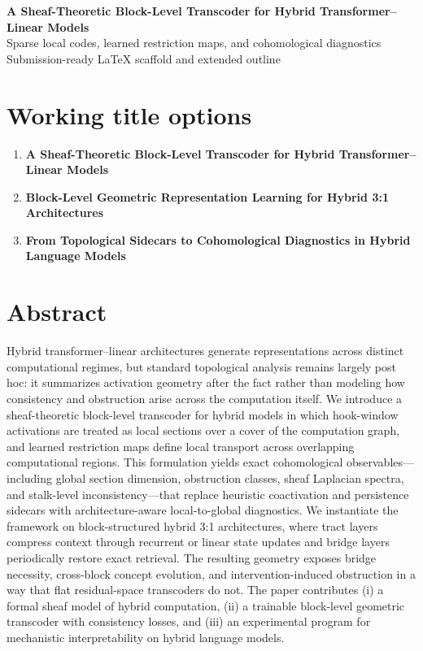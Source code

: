 \documentclass[11pt]{article}
\begin{document}
\begin{center}
{\LARGE \textbf{A Sheaf-Theoretic Block-Level Transcoder for Hybrid Transformer--Linear Models}}\\[0.5em]
{\large Sparse local codes, learned restriction maps, and cohomological diagnostics}\\[1em]
{\normalsize Submission-ready LaTeX scaffold and extended outline}
\end{center}

\vspace{1em}

\section*{Working title options}

\begin{enumerate}[leftmargin=1.5em]
    \item \textbf{A Sheaf-Theoretic Block-Level Transcoder for Hybrid Transformer--Linear Models}
    \item \textbf{Block-Level Geometric Representation Learning for Hybrid 3:1 Architectures}
    \item \textbf{From Topological Sidecars to Cohomological Diagnostics in Hybrid Language Models}
\end{enumerate}

\section*{Abstract}

Hybrid transformer--linear architectures generate representations across distinct computational regimes, but standard topological analysis remains largely post hoc: it summarizes activation geometry after the fact rather than modeling how consistency and obstruction arise across the computation itself. We introduce a sheaf-theoretic block-level transcoder for hybrid models in which hook-window activations are treated as local sections over a cover of the computation graph, and learned restriction maps define local transport across overlapping computational regions. This formulation yields exact cohomological observables---including global section dimension, obstruction classes, sheaf Laplacian spectra, and stalk-level inconsistency---that replace heuristic coactivation and persistence sidecars with architecture-aware local-to-global diagnostics. We instantiate the framework on block-structured hybrid 3:1 architectures, where tract layers compress context through recurrent or linear state updates and bridge layers periodically restore exact retrieval. The resulting geometry exposes bridge necessity, cross-block concept evolution, and intervention-induced obstruction in a way that flat residual-space transcoders do not. The paper contributes (i) a formal sheaf model of hybrid computation, (ii) a trainable block-level geometric transcoder with consistency losses, and (iii) an experimental program for mechanistic interpretability on hybrid language models.
\end{document}
